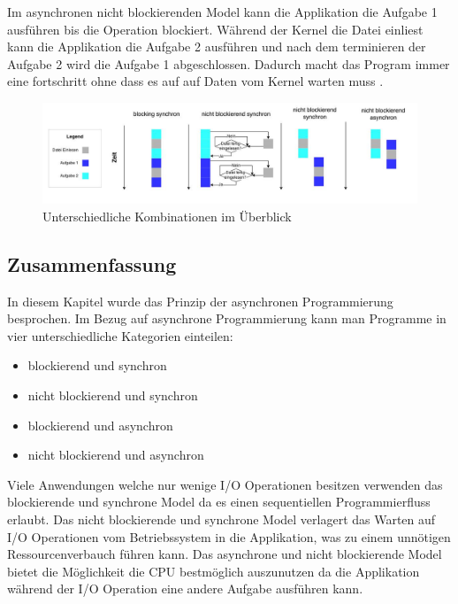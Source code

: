 Im asynchronen nicht blockierenden Model kann die Applikation die Aufgabe 1 ausführen bis die Operation blockiert. Während der Kernel die Datei einliest kann die Applikation die Aufgabe 2 ausführen und nach dem terminieren der Aufgabe 2 wird die Aufgabe 1 abgeschlossen. Dadurch macht das Program immer eine fortschritt ohne dass es auf auf Daten vom Kernel warten muss \cite[]{Pet2015}.

\begin{figure}[!htb]
  \centering
  \includegraphics[width=13cm]{images/synchron_blocking.jpg}
  \caption{
    Unterschiedliche Kombinationen im Überblick
  }
  \label{figure:synchron_blocking}
\end{figure}

\subsection{Zusammenfassung}

In diesem Kapitel wurde das Prinzip der asynchronen Programmierung besprochen. Im Bezug auf asynchrone Programmierung kann man Programme in vier unterschiedliche Kategorien einteilen: 

\begin{itemize}
  \item blockierend und synchron
  \item nicht blockierend und synchron
  \item blockierend und asynchron
  \item nicht blockierend und asynchron
\end{itemize}    

Viele Anwendungen welche nur wenige I/O Operationen besitzen verwenden das blockierende und synchrone Model da es einen sequentiellen Programmierfluss erlaubt. Das nicht blockierende und synchrone Model verlagert das Warten auf I/O Operationen vom Betriebssystem in die Applikation, was zu einem unnötigen Ressourcenverbauch führen kann. Das asynchrone und nicht blockierende Model bietet die Möglichkeit die CPU bestmöglich auszunutzen da die Applikation während der I/O Operation eine andere Aufgabe ausführen kann.